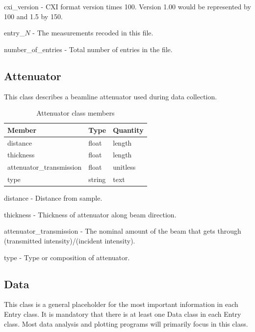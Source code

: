\documentclass[usletter,11pt]{article}
\newcommand{\member}[2]
{ \noindent
{ \color{softBlue}  #1 - } #2
\vspace{0.2cm}
}
\begin{document}
\member{cxi\_version}{CXI format version times 100. Version 1.00 would
  be represented by 100 and 1.5 by 150.}

\member{entry\_$N$}{The measurements recoded in this file.}

\member{number\_of\_entries}{Total number of entries in the file.}

\subsection{Attenuator}
\label{table:attenuator}

This class describes a beamline attenuator used during data collection.

\begin{table}[h!]\sffamily \footnotesize
\caption{Attenuator class members}

\begin{tabular}{p{4.5cm} p{4.5cm}  p{2.5cm}}
\toprule
\bfseries Member     & \bfseries Type & \bfseries Quantity \\
\midrule
distance & float & length \\
thickness & float & length \\
attenuator\_transmission & float & unitless \\ 
type & string & text \\
\bottomrule
\end{tabular}
\end{table}

\member{distance}{Distance from sample.}

\member{thickness}{Thickness of attenuator along beam direction.}

\member{attenuator\_transmission}{The nominal amount of the beam that
gets through (transmitted intensity)/(incident intensity).}

\member{type}{Type or composition of attenuator.}

\subsection{Data}
\label{table:data}

This class is a general placeholder for the most important information
in each Entry class. It is mandatory that there is at least one Data
class in each Entry class. Most data analysis and plotting programs
will primarily focus in this class.
\end{document}
